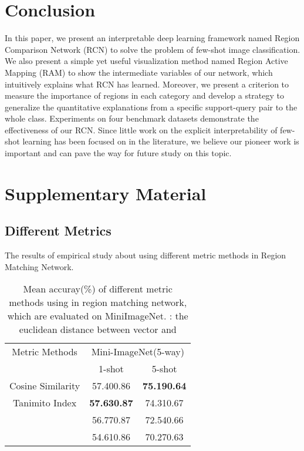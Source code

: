 \documentclass[letterpaper]{article}
\begin{document}
\section{Conclusion}
In this paper, we present an interpretable deep learning framework named Region Comparison Network (RCN) to solve the problem of few-shot image classification. We also present a simple yet useful visualization method named Region Active Mapping (RAM) to show the intermediate variables of our network, which intuitively explains what RCN has learned. Moreover, we present a criterion to measure the importance of regions in each category and develop a strategy to generalize the quantitative explanations from a specific support-query pair to the whole class. Experiments on four benchmark datasets demonstrate the effectiveness of our RCN. Since little work on the explicit interpretability of few-shot learning has been focused on in the literature, we believe our pioneer work is important and can pave the way for future study on this topic. 





\newpage
\section{Supplementary Material}
\subsection{Different Metrics}
The results of empirical study about using different metric methods in Region Matching Network. 

\begin{table}[H]
    \caption{Mean accuray(\%) of different metric methods using in region matching network, which are evaluated on MiniImageNet. : the euclidean distance between vector  and }
    \label{table: different metrics}
    \centering
    \begin{tabular}{c c c}
         \hline
         Metric Methods&\multicolumn{2}{c}{Mini-ImageNet(5-way)}  \\
         &1-shot&5-shot \\ \hline
         Cosine Similarity&57.400.86&\textbf{75.190.64} \\
         \hline
         Tanimito Index&\textbf{57.630.87}&74.310.67 \\
         \hline
         &56.770.87&72.540.66 \\
         \hline
         &54.610.86&70.270.63 \\
         \hline
    \end{tabular}
 
\end{table}
\end{document}
